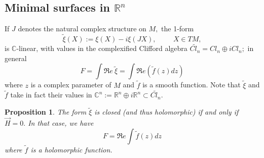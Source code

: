 \documentclass{amsart}
\newtheorem{prop}[lem]{Proposition}
\begin{document}
\subsection{Minimal surfaces in ${\mathbb{R}}^n$}
If $J$ denotes the natural complex structure on $M,$ the 1-form
$$\tilde{\xi}(X):=\xi(X)-i\xi(JX),\hspace{1cm}X\in TM,$$
is ${\mathbb{C}}$-linear, with values in the complexified Clifford algebra $\tilde{Cl_n}=Cl_n\oplus i Cl_n;$ in general
$$F=\int\Re e\ \tilde{\xi}=\int\Re e\left(\tilde{f}(z)dz\right)$$
where $z$ is a complex parameter of $M$ and $\tilde{f}$ is a smooth function. Note that $\tilde{\xi}$ and $\tilde{f}$ take in fact their values in ${\mathbb{C}}^n:={\mathbb{R}}^n\oplus i{\mathbb{R}}^n\subset\tilde{Cl_n}.$
\begin{prop}
The form $\tilde{\xi}$ is closed (and thus holomorphic) if and only if $\vec{H}=0.$ In that case, we have
$$F=\Re e\int\tilde{f}(z)dz$$
where $\tilde{f}$ is a holomorphic function.
\end{prop}
\end{document}
